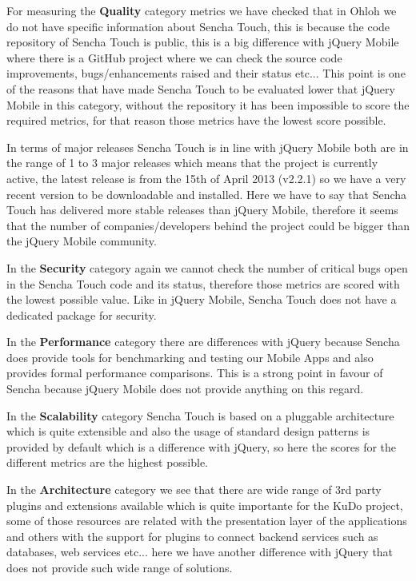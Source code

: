 \documentclass[a4paper,12pt]{book}
\begin{document}
For measuring the \textbf{Quality} category metrics we have checked that in Ohloh we do not have specific information about Sencha Touch\cite{Ohloh Sencha Touch}, this is because the code repository of Sencha Touch is public, this is a big difference with jQuery Mobile where there is a GitHub project where we can check the source code improvements, bugs/enhancements raised and their status etc... This point is one of the reasons that have made Sencha Touch to be evaluated lower that jQuery Mobile in this category, without the repository it has been impossible to score the required metrics, for that reason those metrics have the lowest score possible.

In terms of major releases Sencha Touch is in line with jQuery Mobile both are in the range of 1 to 3 major releases which means that the project is currently active, the latest release is from the 15th of April 2013 (v2.2.1) so we have a very recent version to be downloadable and installed. Here we have to say that Sencha Touch has delivered more stable releases than jQuery Mobile, therefore it seems that the number of companies/developers behind the project could be bigger than the jQuery Mobile community.

In the \textbf{Security} category again we cannot check the number of critical bugs open in the Sencha Touch code and its status, therefore those metrics are scored with the lowest possible value. Like in jQuery Mobile, Sencha Touch does not have a dedicated package for security.

In the \textbf{Performance} category there are differences with jQuery because Sencha does provide tools for benchmarking and testing our Mobile Apps and also provides formal performance comparisons\cite{sencha performance}. This is a strong point in favour of Sencha because jQuery Mobile does not provide anything on this regard.

In the \textbf{Scalability} category Sencha Touch is based on a pluggable architecture which is quite extensible and also the usage of standard design patterns is  provided by default\cite{sencha MVC} which is a difference with jQuery, so here the scores for the different metrics are the highest possible.

In the \textbf{Architecture} category we see that there are wide range of 3rd party plugins and extensions\cite{sencha Try} available which is quite importante for the KuDo project, some of those resources are related with the presentation layer of the applications and others with the support for plugins to connect backend services such as databases, web services etc... here we have another difference with jQuery that does not provide such wide range of solutions.
\end{document}
